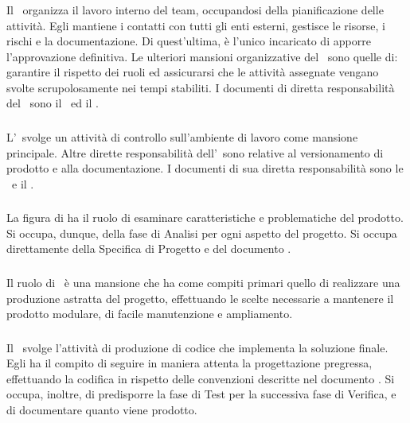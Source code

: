		\subsubsection{\RdP}
		Il \RdP\ organizza il lavoro interno del team, occupandosi della pianificazione delle attività. Egli mantiene i contatti con tutti gli enti esterni, gestisce le risorse, i rischi e la documentazione. Di quest'ultima, è l'unico incaricato di apporre l'approvazione definitiva. Le ulteriori mansioni organizzative del \RdP\ sono quelle di: garantire il rispetto dei ruoli ed assicurarsi che le attività assegnate vengano svolte scrupolosamente nei tempi stabiliti. I documenti di diretta responsabilità del \RdP\ sono il \PdP\ ed il \PdQ.

		\subsubsection{\Amm}
		L'\Amm\ svolge un attività di controllo sull'ambiente di lavoro come mansione principale. Altre dirette responsabilità dell'\Amm\ sono relative al versionamento di prodotto e alla documentazione. I documenti di sua diretta responsabilità sono le \NdP\ e il \PdP.
		
		\subsubsection{\Ana}
		La figura di \Ana ha il ruolo di esaminare caratteristiche e problematiche del prodotto. Si occupa, dunque, della fase di Analisi per ogni aspetto del progetto. Si occupa direttamente della Specifica di Progetto e del documento \AdR.

		\subsubsection{\Prog}
		Il ruolo di \Prog\ è una mansione che ha come compiti primari quello di realizzare una produzione astratta del progetto, effettuando le scelte necessarie a mantenere il prodotto modulare, di facile manutenzione e ampliamento.
		
		\subsubsection{\Progr}
		Il \Progr\ svolge l'attività di produzione di codice che implementa la soluzione finale. Egli ha il compito di seguire in maniera attenta la progettazione pregressa, effettuando la codifica in rispetto delle convenzioni descritte nel documento \NdP. Si occupa, inoltre, di predisporre la fase di Test per la successiva fase di Verifica, e di documentare quanto viene prodotto.
		
